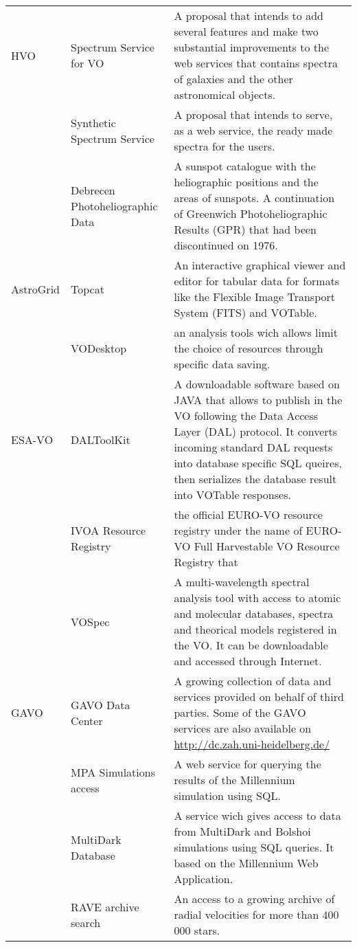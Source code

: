 \begin{table*}[h!t]
\begin{tabular}{|l|l|p{12.5cm}|}
	\hline								
	HVO		& Spectrum Service for VO & A proposal that intends to add several features and make two substantial improvements to the web services that 
									contains spectra of galaxies and the other astronomical objects.\\
			& Synthetic Spectrum Service & A proposal that intends to serve, as a web service, the ready made spectra for the users.\\
			& Debrecen Photoheliographic Data & A sunspot catalogue with the heliographic positions and the areas of sunspots. A continuation of Greenwich 
									Photoheliographic Results (GPR) that had been discontinued on 1976.\\
	\hline								
	AstroGrid& Topcat & An interactive graphical viewer and editor for tabular data for formats like the Flexible Image Transport System (FITS) 
									and VOTable. \\
			& VODesktop & an analysis tools wich allows limit the choice of resources through specific data saving.\\
	\hline		
	ESA-VO	& DALToolKit & A downloadable software based on JAVA that allows to publish in the VO following the Data Access Layer (DAL) protocol. It 
									converts incoming standard DAL requests into database specific SQL queires, then serializes the database result into VOTable 
									responses. \\
			& IVOA Resource Registry & the official EURO-VO resource registry under the name of EURO-VO Full Harvestable VO Resource Registry that \\
			& VOSpec & A multi-wavelength spectral analysis tool with access to atomic and molecular databases, spectra and theorical models registered 
									in the VO. It can be downloadable and accessed through Internet.\\
	\hline								
	GAVO	& GAVO Data Center & A growing collection of data and services provided on behalf of third parties. Some of the GAVO services are also 
									available on \url{http://dc.zah.uni-heidelberg.de/}\\
			& MPA Simulations access & A web service for querying the results of the Millennium simulation using SQL.\\
			& MultiDark Database & A service wich gives access to data from MultiDark and Bolshoi simulations using SQL queries.  It based on the Millennium 
									Web Application. \\
			& RAVE archive search & An access to a growing archive of radial velocities for more than 400 000 stars.\\

\end{tabular}
\end{table*}

